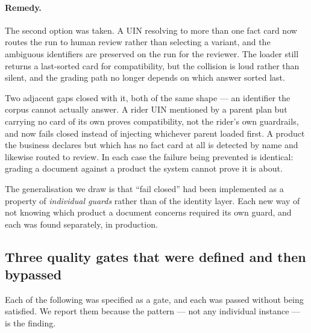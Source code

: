 \documentclass[10pt]{article}
\begin{document}
\paragraph{Remedy.} The second option was taken. A UIN resolving to more than
one fact card now routes the run to human review rather than selecting a
variant, and the ambiguous identifiers are preserved on the run for the
reviewer. The loader still returns a last-sorted card for compatibility, but the
collision is loud rather than silent, and the grading path no longer depends on
which answer sorted last.

Two adjacent gaps closed with it, both of the same shape --- an identifier the
corpus cannot actually answer. A rider UIN mentioned by a parent plan but
carrying no card of its own proves compatibility, not the rider's own
guardrails, and now fails closed instead of injecting whichever parent loaded
first. A product the business declares but which has no fact card at all is
detected by name and likewise routed to review. In each case the failure being
prevented is identical: grading a document against a product the system cannot
prove it is about.

The generalisation we draw is that ``fail closed'' had been implemented as a
property of \emph{individual guards} rather than of the identity layer. Each new
way of not knowing which product a document concerns required its own guard,
and each was found separately, in production.

\subsection{Three quality gates that were defined and then bypassed}

Each of the following was specified as a gate, and each was passed without
being satisfied. We report them because the pattern --- not any individual
instance --- is the finding.
\end{document}
